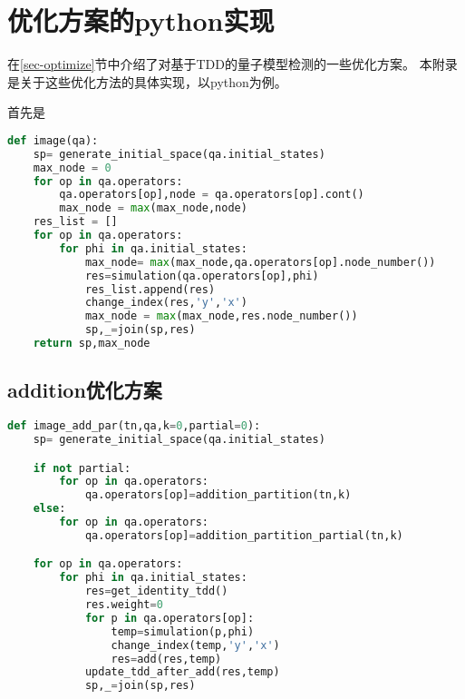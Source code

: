 \thispagestyle{appendixheader}
\setcounter{app_fig}{1}
\setcounter{app_tab}{1}
\setcounter{equation}{0}
\renewcommand\theequation{附\arabic{app}-\arabic{equation}}
\renewcommand\chaptername{附录}
\renewcommand\chaptername{Appendix} 
\renewcommand\thechapter{附录\zhnum{app}} 

\setcounter{chapter}{0}
\setcounter{section}{0}
\chapter{优化方案的python实现}\label{chap:app1}{
在\ref{sec-optimize}节中介绍了对基于TDD的量子模型检测的一些优化方案。
本附录是关于这些优化方法的具体实现，以python为例。

首先是
\begin{lstlisting}[language=Python, caption=Python example]
def image(qa):
    sp= generate_initial_space(qa.initial_states)
    max_node = 0
    for op in qa.operators:
        qa.operators[op],node = qa.operators[op].cont()
        max_node = max(max_node,node)
    res_list = []
    for op in qa.operators:
        for phi in qa.initial_states:
            max_node= max(max_node,qa.operators[op].node_number())
            res=simulation(qa.operators[op],phi)
            res_list.append(res)
            change_index(res,'y','x')
            max_node = max(max_node,res.node_number())
            sp,_=join(sp,res)
    return sp,max_node
\end{lstlisting}
\section*{addition优化方案}
\begin{lstlisting}[language=Python, caption=对量子电路应用addition优化方案]
def image_add_par(tn,qa,k=0,partial=0):
    sp= generate_initial_space(qa.initial_states)

    if not partial:
        for op in qa.operators:
            qa.operators[op]=addition_partition(tn,k)
    else:
        for op in qa.operators:
            qa.operators[op]=addition_partition_partial(tn,k)

    for op in qa.operators:
        for phi in qa.initial_states:
            res=get_identity_tdd()
            res.weight=0
            for p in qa.operators[op]:
                temp=simulation(p,phi)
                change_index(temp,'y','x')
                res=add(res,temp)
            update_tdd_after_add(res,temp)
            sp,_=join(sp,res)


\end{lstlisting}}
